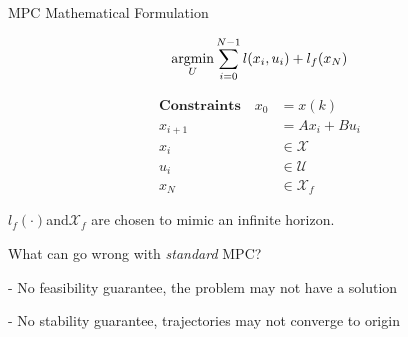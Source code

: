 
\begin{sstTitleBox}{
		MPC Mathematical Formulation
	}
	\begin{sstOnlyFrame}
		\begin{equation}
			\underset U{\operatorname{argmin}}
			\sum_{i=0}^{N-1} l(x_i,u_i) + l_f(x_N)
			\label{mpc:nominal}
		\end{equation}

		\vspace{-3mm}
		\begin{minipage}[t]{0.67\linewidth}
			\begin{align*}
				\textbf{Constraints}
				\quad
				x_0     & = x(k)            \\
				x_{i+1} & =Ax_i + Bu_i      \\
				x_{i}   & \in \mathcal{X}   \\
				u_i     & \in \mathcal{U}   \\
				x_N     & \in \mathcal{X}_f
			\end{align*}
		\end{minipage}

		$l_f(\cdot) $and$ \mathcal{X}_f$
		are chosen to mimic an infinite horizon.
	\end{sstOnlyFrame}
\end{sstTitleBox}

What can go wrong with \textit{standard} MPC?

- No feasibility guarantee, the problem may not have a solution

- No stability guarantee, trajectories may not converge to  origin


